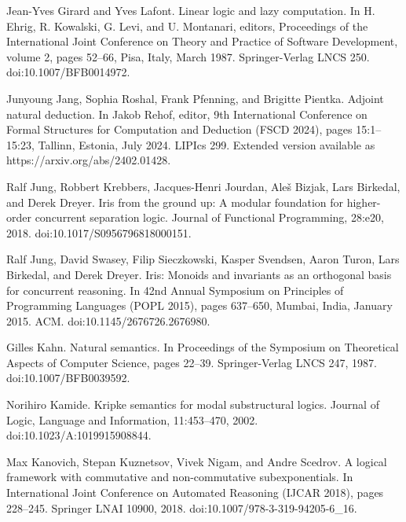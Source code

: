 \par\noindent  [18]  Jean-Yves Girard and Yves Lafont.  Linear logic and lazy computation.  In H. Ehrig, R. Kowalski, G. Levi, and U. Montanari, editors, Proceedings of the International Joint Conference on Theory and Practice of Software Development, volume 2, pages 52–66, Pisa, Italy, March 1987. Springer-Verlag LNCS 250.  doi:10.1007/BFB0014972.  
 
\par\noindent  [19]  Junyoung Jang, Sophia Roshal, Frank Pfenning, and Brigitte Pientka.  Adjoint natural deduction.  In Jakob Rehof, editor, 9th International Conference on Formal Structures for Computation and Deduction (FSCD 2024), pages 15:1–15:23, Tallinn, Estonia, July 2024. LIPIcs 299.  Extended version available as https://arxiv.org/abs/2402.01428.  
 
\par\noindent  [20]  Ralf Jung, Robbert Krebbers, Jacques-Henri Jourdan, Aleš Bizjak, Lars Birkedal, and Derek Dreyer.  Iris from the ground up: A modular foundation for higher-order concurrent separation logic.  Journal of Functional Programming, 28:e20, 2018.  doi:10.1017/S0956796818000151.  
 
\par\noindent  [21]  Ralf Jung, David Swasey, Filip Sieczkowski, Kasper Svendsen, Aaron Turon, Lars Birkedal, and Derek Dreyer.  Iris: Monoids and invariants as an orthogonal basis for concurrent reasoning.  In 42nd Annual Symposium on Principles of Programming Languages (POPL 2015), pages 637–650, Mumbai, India, January 2015. ACM.  doi:10.1145/2676726.2676980.  
 
\par\noindent  [22]  Gilles Kahn.  Natural semantics.  In Proceedings of the Symposium on Theoretical Aspects of Computer Science, pages 22–39. Springer-Verlag LNCS 247, 1987.  doi:10.1007/BFB0039592.  
 
\par\noindent  [23]  Norihiro Kamide.  Kripke semantics for modal substructural logics.  Journal of Logic, Language and Information, 11:453–470, 2002.  doi:10.1023/A:1019915908844.  
 
\par\noindent  [24]  Max Kanovich, Stepan Kuznetsov, Vivek Nigam, and Andre Scedrov.  A logical framework with commutative and non-commutative subexponentials.  In International Joint Conference on Automated Reasoning (IJCAR 2018), pages 228–245. Springer LNAI 10900, 2018.  doi:10.1007/978-3-319-94205-6\_16.  
 
